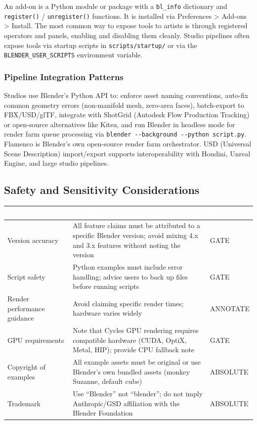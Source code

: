 \documentclass[11pt,letterpaper]{article}
\newcommand{\tableheader}[1]{\textbf{\sffamily\textcolor{white}{#1}}}
\begin{document}
An add-on is a Python module or package with a \texttt{bl\_info} dictionary and \texttt{register()} / \texttt{unregister()} functions. It is installed via Preferences > Add-ons > Install. The most common way to expose tools to artists is through registered operators and panels, enabling and disabling them cleanly. Studio pipelines often expose tools via startup scripts in \texttt{scripts/startup/} or via the \texttt{BLENDER\_USER\_SCRIPTS} environment variable.

\subsubsection{Pipeline Integration Patterns}

Studios use Blender's Python API to: enforce asset naming conventions, auto-fix common geometry errors (non-manifold mesh, zero-area faces), batch-export to FBX/USD/glTF, integrate with ShotGrid (Autodesk Flow Production Tracking) or open-source alternatives like Kitsu, and run Blender in headless mode for render farm queue processing via \texttt{blender -{}-background -{}-python script.py}. Flamenco is Blender's own open-source render farm orchestrator. USD (Universal Scene Description) import/export supports interoperability with Houdini, Unreal Engine, and large studio pipelines.

\subsection{Safety and Sensitivity Considerations}

\begin{center}
\begin{tabularx}{\textwidth}{L{4cm}XC{2.5cm}}
\toprule
{}
\tableheader{Consideration} & \tableheader{Guidance} & \tableheader{Priority} \\
\midrule
Version accuracy & All feature claims must be attributed to a specific Blender version; avoid mixing 4.x and 3.x features without noting the version & GATE \\
Script safety & Python examples must include error handling; advise users to back up files before running scripts & GATE \\
Render performance guidance & Avoid claiming specific render times; hardware varies widely & ANNOTATE \\
GPU requirements & Note that Cycles GPU rendering requires compatible hardware (CUDA, OptiX, Metal, HIP); provide CPU fallback note & GATE \\
Copyright of examples & All example assets must be original or use Blender's own bundled assets (monkey Suzanne, default cube) & ABSOLUTE \\
Trademark & Use ``Blender'' not ``blender''; do not imply Anthropic/GSD affiliation with the Blender Foundation & ABSOLUTE \\
\bottomrule
\end{tabularx}
\end{center}
\end{document}
